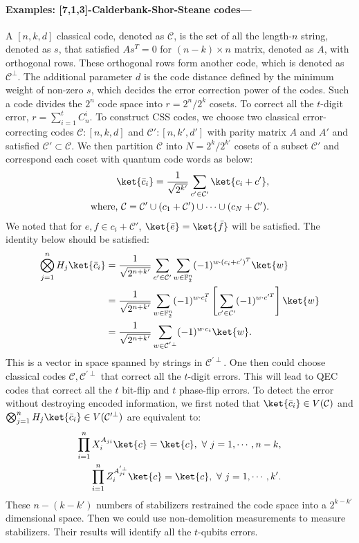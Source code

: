 \documentclass[11pt]{article}
\begin{document}
\paragraph*{Examples: [7,1,3]-Calderbank-Shor-Steane codes---\!\!\!}
A $[n,k,d]$ classical code, denoted as $\mathcal{C}$, is the set of all the length-$n$ string, denoted as $s$, that satisfied $As^T = 0$ for $(n - k)\times n   $ matrix, denoted as $A$, with orthogonal rows. 
These orthogonal rows form another code, which is denoted as $\mathcal{C}^{\perp}$. 
The additional parameter $d$ is the code distance defined by the minimum weight of non-zero $s$, which decides the error correction power of the codes. 
Such a code divides the $2^n$ code space into $r = 2^n / 2^k$ cosets. 
To correct all the $t$-digit error, $r = \sum_{i = 1}^t C_{n}^i$.  
To construct CSS codes, we choose two classical error-correcting codes $\mathcal{C}:[n,k,d]$ and $\mathcal{C}':[n,k',d']$ with parity matrix $A$ and $A'$ and satisfied $\mathcal{C'} \subset \mathcal{C} $. 
We then partition $\mathcal{C}$ into $N = 2^k / 2^{k'}$ cosets of a subset $\mathcal{C}'$ and correspond each coset with quantum code words as below:
\begin{align}
    \ket{\Bar{c}_i} = \frac{1}{\sqrt{2^{ k'}}} \sum_{c' \in \mathcal{C}'} \ket{c_i + c'}, \notag \\
    \text{where,~} \mathcal{C} = \mathcal{C}' \cup (c_1 + \mathcal{C}') \cup \cdots \cup (c_N + \mathcal{C}').
\end{align}
We noted that for $e,f \in c_i + \mathcal{C}'$, $\ket{\Bar{e}} = \ket{\Bar{f}}$ will be satisfied. The identity below should be satisfied:
\begin{align}
    \bigotimes^n_{j=1} H_j \ket{\Bar{c}_i} &= \frac{1}{\sqrt{2^{n+ k'}}} \sum_{c' \in \mathcal{C}'} \sum_{w \in \mathbb{F}_2^n}(-1)^{w \cdot (c_i + c')^T } \ket{w} \notag \\
    &= \frac{1}{\sqrt{2^{n+ k'}}}  \sum_{w \in \mathbb{F}_2^n} (-1)^{w \cdot c_i^T} \left[\sum_{c' \in \mathcal{C}'} (-1)^{w \cdot c'^T }\right] \ket{w} \notag \\
    &= \frac{1}{\sqrt{2^{n+ k'}}}  \sum_{w \in \mathcal{C}^{'\perp}} (-1)^{w \cdot c_i}  \ket{w}.
\end{align}
This is a vector in space spanned by strings in $\mathcal{C}^{'\perp}$. One then could choose classical codes $\mathcal{C},\mathcal{C}^{'\perp}$ that correct all the $t$-digit errors. This will lead to QEC codes that correct all the $t$ bit-flip and $t$ phase-flip errors. To detect the error without destroying encoded information, we first noted that $\ket{\Bar{c}_i} \in V(\mathcal{C})$ and $\bigotimes^n_{j=1} H_j \ket{\Bar{c}_i} \in V(\mathcal{C}'^\perp)$ are equivalent to:
\begin{align}
    \prod_{i = 1}^n X_i^{A_{ji}} \ket{c} = \ket{c}, ~\forall~j = 1, \cdots, n-k , \\
    \prod_{i = 1}^n Z_i^{A_{ji}^{'\perp}} \ket{c} = \ket{c}, ~\forall~j = 1,\cdots,k'.
\end{align}
These $n - (k - k')$ numbers of stabilizers restrained the code space into a $2^{k - k'}$ dimensional space. Then we could use non-demolition measurements to measure stabilizers. Their results will identify all the $t$-qubits errors. 
\end{document}
